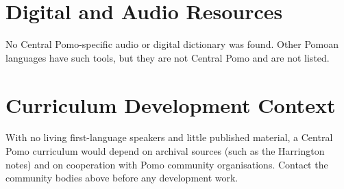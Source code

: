 \documentclass[12pt]{article}
\begin{document}
\section{Digital and Audio Resources}
No Central Pomo-specific audio or digital dictionary was found. Other Pomoan languages have such tools, but they are not Central Pomo and are not listed.
\section{Curriculum Development Context}
With no living first-language speakers and little published material, a Central Pomo curriculum would depend on archival sources (such as the Harrington notes) and on cooperation with Pomo community organisations. Contact the community bodies above before any development work.
\end{document}

